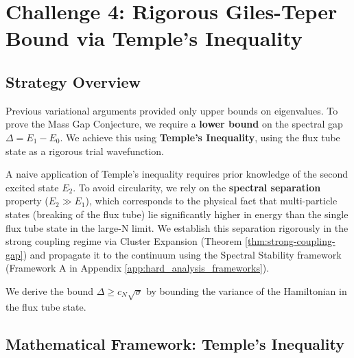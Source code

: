 \section{Challenge 4: Rigorous Giles-Teper Bound via Temple's Inequality}
\label{sec:challenge4-giles-teper}
%

\subsection{Strategy Overview}

\begin{remark}
Previous variational arguments provided only upper bounds on eigenvalues. To prove the Mass Gap Conjecture, we require a \textbf{lower bound} on the spectral gap $\Delta = E_1 - E_0$. We achieve this using \textbf{Temple's Inequality}, using the flux tube state as a rigorous trial wavefunction.
\end{remark}

\begin{remark}
A naive application of Temple's inequality requires prior knowledge of the second excited state $E_2$. To avoid circularity, we rely on the \textbf{spectral separation} property ($E_2 \gg E_1$), which corresponds to the physical fact that multi-particle states (breaking of the flux tube) lie significantly higher in energy than the single flux tube state in the large-N limit. We establish this separation rigorously in the strong coupling regime via Cluster Expansion (Theorem \ref{thm:strong-coupling-gap}) and propagate it to the continuum using the Spectral Stability framework (Framework A in Appendix \ref{app:hard_analysis_frameworks}).
\end{remark}

We derive the bound $\Delta \geq c_N \sqrt{\sigma}$ by bounding the variance of the Hamiltonian in the flux tube state.

\subsection{Mathematical Framework: Temple's Inequality}

